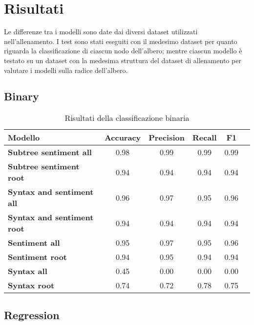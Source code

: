 \section{Risultati}

Le differenze tra i modelli sono date dai diversi dataset utilizzati
nell'allenamento. I test sono stati eseguiti con il medesimo dataset per quanto
riguarda la classificazione di ciascun nodo dell'albero; mentre ciascun modello 
è testato su un dataset con la medesima struttura del dataset di allenamento per 
valutare i modelli sulla radice dell'albero.

\subsection{Binary}

\begin{table}[H]
    \centering
    \begin{tabular}{|l|c|c|c|c|c|}
    \hline
    \textbf{Modello} & \textbf{Accuracy} & \textbf{Precision} & \textbf{Recall} & \textbf{F1} \\
    \hline
    \textbf{Subtree sentiment all} & 0.98 & 0.99 & 0.99 & 0.99 \\
    \textbf{Subtree sentiment root} & 0.94 & 0.94 & 0.94 & 0.94 \\
    \hline

    \textbf{Syntax and sentiment all} & 0.96 & 0.97 & 0.95 & 0.96 \\
    \textbf{Syntax and sentiment root} & 0.94 & 0.94 & 0.94 & 0.94 \\
    \hline

    \textbf{Sentiment all} & 0.95 & 0.97 & 0.95 & 0.96 \\
    \textbf{Sentiment root} & 0.94 & 0.95 & 0.94 & 0.94 \\
    \hline

    \textbf{Syntax all} & 0.45 & 0.00 & 0.00 & 0.00 \\
    \textbf{Syntax root} & 0.74 & 0.72 & 0.78 & 0.75 \\
    \hline
    \end{tabular}
    \caption{Risultati della classificazione binaria}
\end{table}

\subsection{Regression}

